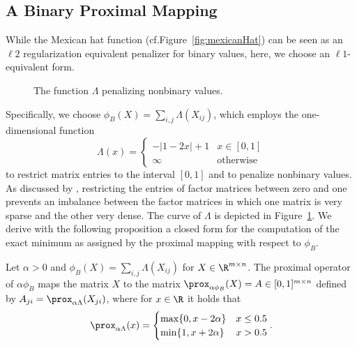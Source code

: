 \subsection{A Binary Proximal Mapping}\label{sec:PT:binprox}
While the Mexican hat function (cf.\@ Figure~\ref{fig:mexicanHat}) can be seen as an $\ell2$ regularization equivalent penalizer for binary values, here, we choose an $\ell1$-equivalent form.
\begin{figure}
\centering

\caption{The function $\Lambda$ penalizing nonbinary values.}
\label{fig:lambda}
\end{figure}
Specifically, we choose $\phi_B(X)=\sum_{i,j}\Lambda(X_{ij})$, which employs the one-dimensional function 
\[
	\Lambda(x) = 
    \begin{cases}
        -\lvert 1-2x\rvert +1 &x\in[0,1]\\
        \infty &\text{otherwise}
    \end{cases}
\]
to restrict matrix entries to the interval $[0,1]$ and to penalize nonbinary values. As discussed by \cite{zhang2010binary}, restricting the entries of factor matrices between zero and one prevents an imbalance between the factor matrices in which one matrix is very sparse and the other very dense. The curve of $\Lambda$ is depicted  in Figure~\ref{fig:lambda}. 
We derive with the following proposition a closed form for the computation of the exact minimum as assigned by the proximal mapping with respect to $\phi_B$. 
\begin{theorem}
Let $\alpha>0$ and $\phi_B(X)=\sum_{i,j}\Lambda(X_{ij})$ for $X\in\R^{m\times n}$. The proximal operator of $\alpha\phi_B$ maps the matrix $X$ to the matrix $\prox_{\alpha\phi_B}(X)=A\in [0,1]^{m\times n}$ defined by $A_{ji}=\prox_{\alpha\Lambda}(X_{ji})$, where for $x\in \R$ it holds that
    \begin{equation}\label{eq:binprox}
	\prox_{\alpha \Lambda}(x)=
    \begin{cases}
        \max\{0,x-2\alpha\} &x\leq0.5\\
        \min\{1,x+2\alpha\} &x>0.5
    \end{cases}.
    \end{equation}
\end{theorem}
